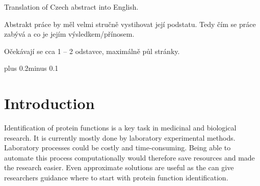\documentclass[11pt,twoside,a4paper]{book}
\begin{document}



 
\abstractpage

Translation of Czech abstract into English.


\baselineskip

\noindent
Abstrakt práce by měl velmi stručně vystihovat její podstatu. Tedy čím se práce zabývá a co je jejím výsledkem/přínosem.

\noindent
Očekávají se cca 1 -- 2 odstavce, maximálně půl stránky.


\tableofcontents



\listoffigures



\listoftables



\mainbodystarts
\normalfont
{}\baselineskip plus 0.2\baselineskip minus 0.1\baselineskip



% 
% 

\chapter{Introduction}
Identification of protein functions is a key task in medicinal and biological research.
It is currently mostly done by laboratory experimental methods.
Laboratory processes could be costly and time-consuming. 
Being able to automate this process computationally would therefore save resources
and made the research easier.
Even approximate solutions are useful as the can give researchers guidance where
to start with protein function identification.
\end{document}
